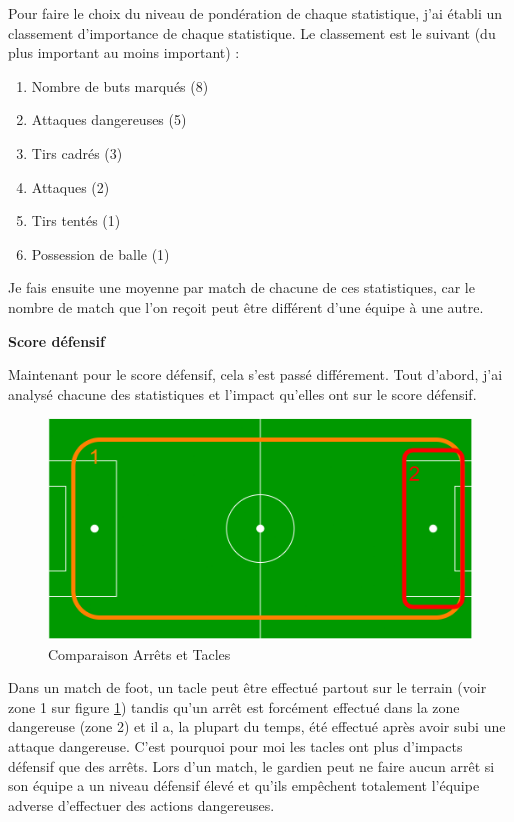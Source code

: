 \documentclass[a4paper,14pt]{extarticle}
\begin{document}
{Pour faire le choix du niveau de pondération de chaque statistique, j'ai établi un classement d'importance de chaque statistique. Le classement est le suivant (du plus important au moins important) :
\begin{enumerate}
    \item Nombre de buts marqués (8)
    \item Attaques dangereuses (5)
    \item Tirs cadrés (3)
    \item Attaques (2)
    \item Tirs tentés (1)
    \item Possession de balle (1)
\end{enumerate}
Je fais ensuite une moyenne par match de chacune de ces statistiques, car le nombre de match que l'on reçoit peut être différent d'une équipe à une autre.

\noindent\textbf{Score défensif}

Maintenant pour le score défensif, cela s'est passé différement. Tout d'abord, j'ai analysé chacune des statistiques et l'impact qu'elles ont sur le score défensif.

\begin{figure}[H]
    \centering
    \includegraphics[width=12cm]{../img/schemaPonderationDef.png}
    \caption{Comparaison Arrêts et Tacles}
    \label{fig:comparaisonArretsTacles}
\end{figure}

Dans un match de foot, un tacle peut être effectué partout sur le terrain (voir zone 1 sur figure \ref{fig:comparaisonArretsTacles}) tandis qu'un arrêt est forcément effectué dans la zone dangereuse (zone 2) et il a, la plupart du temps, été effectué après avoir subi une attaque dangereuse. C'est pourquoi pour moi les tacles ont plus d'impacts défensif que des arrêts. Lors d'un match, le gardien peut ne faire aucun arrêt si son équipe a un niveau défensif élevé et qu'ils empêchent totalement l'équipe adverse d'effectuer des actions dangereuses. 

}
\end{document}
